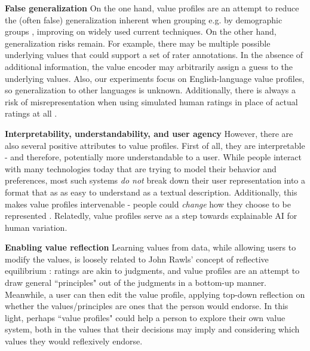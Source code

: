 \documentclass[11pt]{article}
\begin{document}
\textbf{False generalization}
On the one hand, value profiles are an attempt to reduce the (often false) generalization inherent when grouping e.g. by demographic groups \cite{dev-etal-2022-measures}, improving on widely used current techniques. On the other hand, generalization risks remain. For example, there may be multiple possible underlying values that could support a set of rater annotations. In the absence of additional information, the value encoder may arbitrarily assign a guess to the underlying values.
Also, our experiments focus on English-language value profiles, so generalization to other languages is unknown.
Additionally, there is always a risk of misrepresentation when using simulated human ratings in place of actual ratings at all \citep{agnew:2024}.

\textbf{Interpretability, understandability, and user agency}
However, there are also several positive attributes to value profiles. First of all, they are interpretable - and therefore, potentially more understandable to a user. While people interact with many technologies today that are trying to model their behavior and preferences, most such systems \textit{do not} break down their user representation into a format that as as easy to understand as a textual description.
Additionally, this makes value profiles intervenable - people could \textit{change} how they choose to be represented \cite{Radlinski2019,lazar2024moralcaseusinglanguage}.
Relatedly, value profiles serve as a step towards explainable AI \citep{arrieta2019explainableartificialintelligencexai, koh2020conceptbottleneckmodels} for human variation.

\textbf{Enabling value reflection}
Learning values from data, while allowing users to modify the values, is loosely related to John Rawls' concept of reflective equilibrium \citep{rawls2005political, sep-reflective-equilibrium}: ratings are akin to judgments, and value profiles are an attempt to draw general ``principles" out of the judgments in a bottom-up manner. Meanwhile, a user can then edit the value profile, applying top-down reflection on whether the values/principles are ones that the person would endorse.
In this light, perhaps ``value profiles" could help a person to explore their own value system, both in the values that their decisions may imply and considering which values they would reflexively endorse.
\end{document}
